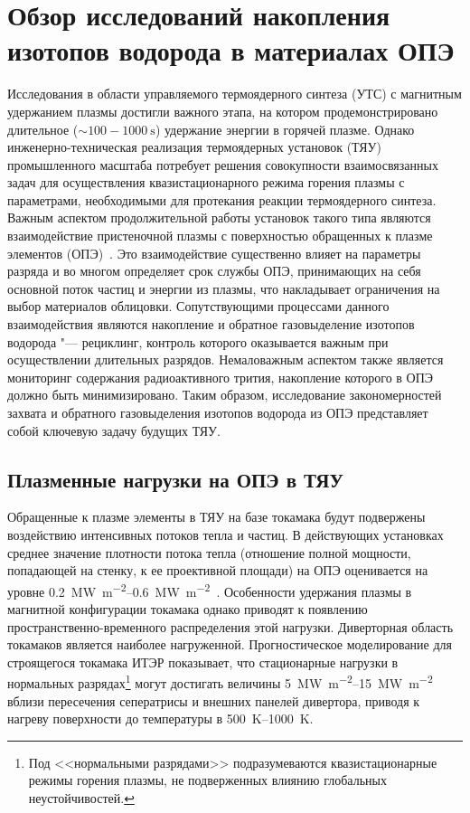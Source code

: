 \chapter{Обзор исследований накопления изотопов водорода в материалах ОПЭ}\label{ch:ch1}

Исследования в области управляемого термоядерного синтеза (УТС) с магнитным удержанием плазмы достигли важного этапа, на котором продемонстрировано длительное ($\sim100-\SI{1000}{\second}$) удержание энергии в горячей плазме. Однако инженерно-техническая реализация термоядерных установок (ТЯУ) промышленного масштаба потребует решения совокупности взаимосвязанных задач для осуществления квазистационарного режима горения плазмы с параметрами, необходимыми для протекания реакции термоядерного синтеза. Важным аспектом продолжительной работы установок такого типа являются взаимодействие пристеночной плазмы с поверхностью обращенных к плазме элементов (ОПЭ)~\cite{Krieger2025}. Это взаимодействие существенно влияет на параметры разряда и во многом определяет срок службы ОПЭ, принимающих на себя основной поток частиц и энергии из плазмы, что накладывает ограничения на выбор материалов облицовки. Сопутствующими процессами данного взаимодействия являются накопление и обратное газовыделение изотопов водорода "--- рециклинг, контроль которого оказывается важным при осуществлении длительных разрядов. Немаловажным аспектом также является мониторинг содержания радиоактивного трития, накопление которого в ОПЭ должно быть минимизировано. Таким образом, исследование закономерностей захвата и обратного газовыделения изотопов водорода из ОПЭ представляет собой ключевую задачу будущих ТЯУ.

\section{Плазменные нагрузки на ОПЭ в ТЯУ}\label{sec:ch1/sec1}

Обращенные к плазме элементы в ТЯУ на базе токамака будут подвержены воздействию интенсивных потоков тепла и частиц. В действующих установках среднее значение плотности потока тепла (отношение полной мощности, попадающей на стенку, к ее проективной площади) на ОПЭ оценивается на уровне \SIrange{0.2}{0.6}{\mega\watt\per\metre\squared}~\cite{Mazul2021}. Особенности удержания плазмы в магнитной конфигурации токамака однако приводят к появлению пространственно-временного распределения этой нагрузки. Диверторная область токамаков является наиболее нагруженной. Прогностическое моделирование для строящегося токамака ИТЭР показывает, что стационарные нагрузки в нормальных разрядах\footnote{Под <<нормальными разрядами>> подразумеваются квазистационарные режимы горения плазмы, не подверженных влиянию глобальных неустойчивостей.} могут достигать величины \SIrange{5}{15}{\mega\watt\per\meter\squared}~\cite{Pitts2019,Orrico2023} вблизи пересечения сеператрисы и внешних панелей дивертора, приводя к нагреву поверхности до температуры в \SIrange{500}{1000}{\kelvin}.


